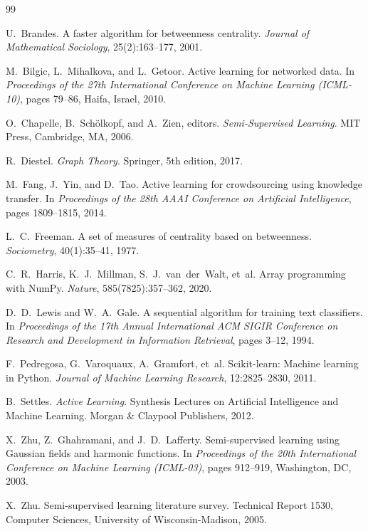 \documentclass[12pt]{article}
\begin{document}
\begin{thebibliography}{99}

U.~Brandes.
\newblock A faster algorithm for betweenness centrality.
\newblock \emph{Journal of Mathematical Sociology}, 25(2):163--177, 2001.

M.~Bilgic, L.~Mihalkova, and L.~Getoor.
\newblock Active learning for networked data.
\newblock In \emph{Proceedings of the 27th International Conference on Machine Learning (ICML-10)}, pages 79--86, Haifa, Israel, 2010.

O.~Chapelle, B.~Sch\"{o}lkopf, and A.~Zien, editors.
\newblock \emph{Semi-Supervised Learning}.
\newblock MIT Press, Cambridge, MA, 2006.

R.~Diestel.
\newblock \emph{Graph Theory}.
\newblock Springer, 5th edition, 2017.

M.~Fang, J.~Yin, and D.~Tao.
\newblock Active learning for crowdsourcing using knowledge transfer.
\newblock In \emph{Proceedings of the 28th AAAI Conference on Artificial Intelligence}, pages 1809--1815, 2014.

L.~C.~Freeman.
\newblock A set of measures of centrality based on betweenness.
\newblock \emph{Sociometry}, 40(1):35--41, 1977.

C.~R.~Harris, K.~J.~Millman, S.~J.~van~der~Walt, et~al.
\newblock Array programming with {NumPy}.
\newblock \emph{Nature}, 585(7825):357--362, 2020.

D.~D.~Lewis and W.~A.~Gale.
\newblock A sequential algorithm for training text classifiers.
\newblock In \emph{Proceedings of the 17th Annual International ACM SIGIR Conference on Research and Development in Information Retrieval}, pages 3--12, 1994.

F.~Pedregosa, G.~Varoquaux, A.~Gramfort, et~al.
\newblock Scikit-learn: Machine learning in {Python}.
\newblock \emph{Journal of Machine Learning Research}, 12:2825--2830, 2011.

B.~Settles.
\newblock \emph{Active Learning}.
\newblock Synthesis Lectures on Artificial Intelligence and Machine Learning. Morgan \& Claypool Publishers, 2012.

X.~Zhu, Z.~Ghahramani, and J.~D.~Lafferty.
\newblock Semi-supervised learning using {G}aussian fields and harmonic functions.
\newblock In \emph{Proceedings of the 20th International Conference on Machine Learning (ICML-03)}, pages 912--919, Washington, DC, 2003.

X.~Zhu.
\newblock Semi-supervised learning literature survey.
\newblock Technical Report 1530, Computer Sciences, University of Wisconsin-Madison, 2005.

\end{thebibliography}
\end{document}
